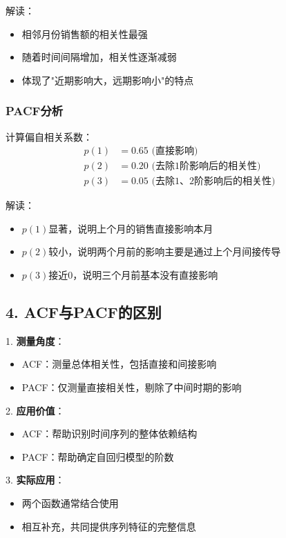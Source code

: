 解读：
\begin{itemize}
    \item 相邻月份销售额的相关性最强
    \item 随着时间间隔增加，相关性逐渐减弱
    \item 体现了"近期影响大，远期影响小"的特点
\end{itemize}

\subsubsection{PACF分析}
计算偏自相关系数：
\begin{align*}
p(1) &= 0.65 \text{ (直接影响)} \\
p(2) &= 0.20 \text{ (去除1阶影响后的相关性)} \\
p(3) &= 0.05 \text{ (去除1、2阶影响后的相关性)}
\end{align*}

解读：
\begin{itemize}
    \item $p(1)$显著，说明上个月的销售直接影响本月
    \item $p(2)$较小，说明两个月前的影响主要是通过上个月间接传导
    \item $p(3)$接近0，说明三个月前基本没有直接影响
\end{itemize}

\subsection{4. ACF与PACF的区别}

1. \textbf{测量角度}：
\begin{itemize}
    \item ACF：测量总体相关性，包括直接和间接影响
    \item PACF：仅测量直接相关性，剔除了中间时期的影响
\end{itemize}

2. \textbf{应用价值}：
\begin{itemize}
    \item ACF：帮助识别时间序列的整体依赖结构
    \item PACF：帮助确定自回归模型的阶数
\end{itemize}

3. \textbf{实际应用}：
\begin{itemize}
    \item 两个函数通常结合使用
    \item 相互补充，共同提供序列特征的完整信息
\end{itemize}

